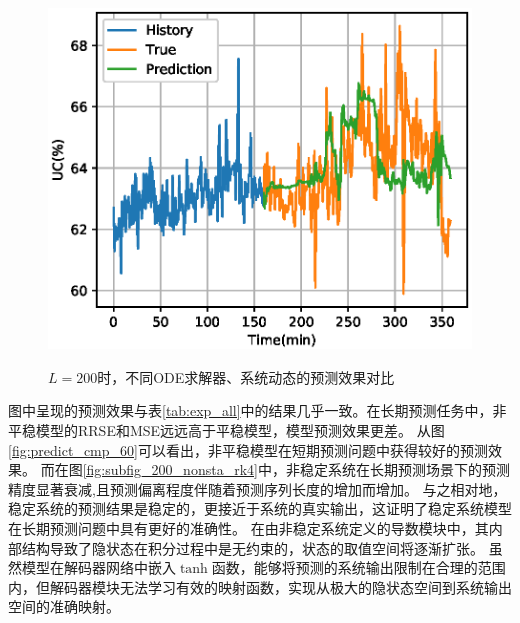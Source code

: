 \begin{figure}[t]
{\begin{minipage}[t]{0.33\linewidth}
\includegraphics[width=\linewidth,trim=12 0 0 20,clip]{figures/chapter3/predict_cmp/UC_GRU_sta_rk4_200.eps}
\end{minipage}%
\label{fig:subfig_200_sta_rk4}
}%
\centering
\caption{$L=200$时，不同ODE求解器、系统动态的预测效果对比
} 
\label{fig:predict_cmp_200}
\end{figure}
图中呈现的预测效果与表\ref{tab:exp_all}中的结果几乎一致。在长期预测任务中，非平稳模型的RRSE和MSE远远高于平稳模型，模型预测效果更差。
从图\ref{fig:predict_cmp_60}可以看出，非平稳模型在短期预测问题中获得较好的预测效果。
而在图\ref{fig:subfig_200_nonsta_rk4}中，非稳定系统在长期预测场景下的预测精度显著衰减,且预测偏离程度伴随着预测序列长度的增加而增加。
与之相对地，稳定系统的预测结果是稳定的，更接近于系统的真实输出，这证明了稳定系统模型在长期预测问题中具有更好的准确性。
在由非稳定系统定义的导数模块中，其内部结构导致了隐状态在积分过程中是无约束的，状态的取值空间将逐渐扩张。
虽然模型在解码器网络中嵌入$\tanh$函数，能够将预测的系统输出限制在合理的范围内，但解码器模块无法学习有效的映射函数，实现从极大的隐状态空间到系统输出空间的准确映射。

